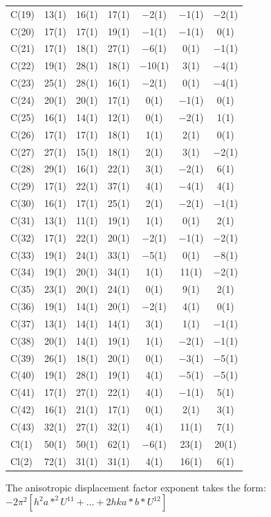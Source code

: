 \begin{center}
{\begin{supertabular}{lcccccc}
C(19)&13(1) &16(1)&17(1) &$-$2(1)&$-$1(1) &$-$2(1)\\
C(20)&17(1) &17(1)&19(1) &$-$1(1)&$-$1(1) &0(1)\\
C(21)&17(1) &18(1)&27(1) &$-$6(1)&0(1) &$-$1(1)\\
C(22)&19(1) &28(1)&18(1) &$-$10(1)&3(1) &$-$4(1)\\
C(23)&25(1) &28(1)&16(1) &$-$2(1)&0(1) &$-$4(1)\\
C(24)&20(1) &20(1)&17(1) &0(1)&$-$1(1) &0(1)\\
C(25)&16(1) &14(1)&12(1) &0(1)&$-$2(1) &1(1)\\
C(26)&17(1) &17(1)&18(1) &1(1)&2(1) &0(1)\\
C(27)&27(1) &15(1)&18(1) &2(1)&3(1) &$-$2(1)\\
C(28)&29(1) &16(1)&22(1) &3(1)&$-$2(1) &6(1)\\
C(29)&17(1) &22(1)&37(1) &4(1)&$-$4(1) &4(1)\\
C(30)&16(1) &17(1)&25(1) &2(1)&$-$2(1) &$-$1(1)\\
C(31)&13(1) &11(1)&19(1) &1(1)&0(1) &2(1)\\
C(32)&17(1) &22(1)&20(1) &$-$2(1)&$-$1(1) &$-$2(1)\\
C(33)&19(1) &24(1)&33(1) &$-$5(1)&0(1) &$-$8(1)\\
C(34)&19(1) &20(1)&34(1) &1(1)&11(1) &$-$2(1)\\
C(35)&23(1) &20(1)&24(1) &0(1)&9(1) &2(1)\\
C(36)&19(1) &14(1)&20(1) &$-$2(1)&4(1) &0(1)\\
C(37)&13(1) &14(1)&14(1) &3(1)&1(1) &$-$1(1)\\
C(38)&20(1) &14(1)&19(1) &1(1)&$-$2(1) &$-$1(1)\\
C(39)&26(1) &18(1)&20(1) &0(1)&$-$3(1) &$-$5(1)\\
C(40)&19(1) &28(1)&19(1) &4(1)&$-$5(1) &$-$5(1)\\
C(41)&17(1) &27(1)&22(1) &4(1)&$-$1(1) &5(1)\\
C(42)&16(1) &21(1)&17(1) &0(1)&2(1) &3(1)\\
C(43)&32(1) &27(1)&32(1) &4(1)&11(1) &7(1)\\
Cl(1)&50(1) &50(1)&62(1) &$-$6(1)&23(1) &20(1)\\
Cl(2)&72(1) &31(1)&31(1) &4(1)&16(1) &6(1)\\
\end{supertabular}
}
\end{center}

{ \footnotesize
The anisotropic displacement factor exponent takes the form: 
$-2\pi^2\left[ h^2a*^2U^{11} + ... + 2 h k a* b* U^{12} \right]$ }
